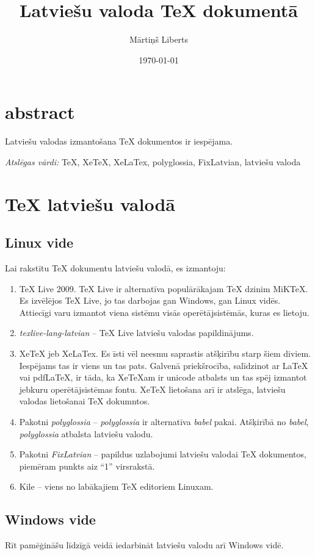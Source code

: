 \documentclass[a4paper,11pt]{book}
\begin{document}
\author{Mārtiņš Liberts}
\title{Latviešu valoda TeX dokumentā}

\date{\today}

\maketitle

\section*{abstract}

Latviešu valodas izmantošana TeX dokumentos ir iespējama.

\textit{Atslēgas vārdi:} TeX, XeTeX, XeLaTex, polyglossia, FixLatvian, latviešu valoda


\section*{TeX latviešu valodā}

\subsection{Linux vide}

Lai rakstītu TeX dokumentu latviešu valodā, es izmantoju:
\begin{enumerate}
 \item TeX Live 2009. TeX Live ir alternatīva populārākajam TeX dzinim MiKTeX. Es izvēlējos TeX Live, jo tas darbojas gan Windows, gan Linux vidēs. Attiecīgi varu izmantot viena sistēmu visās operētājsistēmās, kuras es lietoju.
 \item \textit{texlive-lang-latvian} -- TeX Live latviešu valodas papildinājums.
 \item XeTeX jeb XeLaTex. Es īsti vēl neesmu saprastis atšķirību starp šiem diviem. Iespējams tas ir viens un tas pats. Galvenā priekšrocība, salīdzinot ar LaTeX vai pdfLaTeX, ir tāda, ka XeTeXam ir unicode atbalsts un tas spēj izmantot jebkuru operētājsistēmas fontu. XeTeX lietošana arī ir atslēga, latviešu valodas lietošanai TeX dokumntos.
 \item Pakotni \textit{polyglossia} -- \textit{polyglossia} ir alternatīva \textit{babel} pakai. Atšķirībā no \textit{babel}, \textit{polyglossia} atbalsta latviešu valodu.
 \item Pakotni \textit{FixLatvian} -- papildus uzlabojumi latviešu valodai TeX dokumentos, piemēram punkts aiz ``1'' virsrakstā.
 \item Kile -- viens no labākajiem TeX editoriem Linuxam.
\end{enumerate}

\subsection{Windows vide}

Rīt pamēģināšu līdzīgā veidā iedarbināt latviešu valodu arī Windows vidē.
\end{document}
